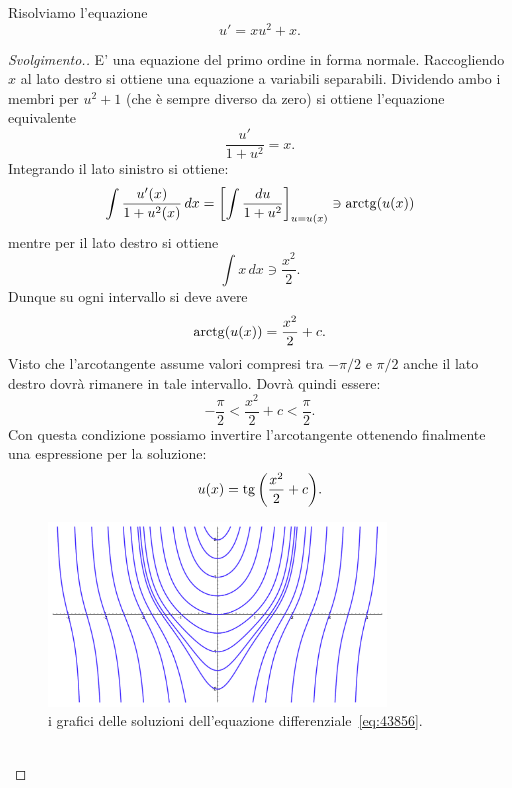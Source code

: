 \begin{example}
Risolviamo l'equazione
\begin{equation}\label{eq:43856}
  u' = x u^2 + x.
\end{equation}
\end{example}
%
\begin{proof}[Svolgimento.]
E' una equazione del primo ordine in forma normale.
Raccogliendo $x$ al lato destro si ottiene una equazione a variabili separabili.
Dividendo ambo i membri per $u^2+1$ (che è sempre diverso da zero) si ottiene l'equazione equivalente
\[
\frac{u'}{1+u^2} = x.
\]
Integrando il lato sinistro si ottiene:
\[
  \int \frac{u'(x)}{1+u^2(x)}\, dx
  = {\left[ \int \frac{du}{1+u^2} \right]}_{u=u(x)}
  \ni \operatorname{arctg}(u(x))
\]
mentre per il lato destro si ottiene
\[
  \int x\, dx \ni \frac{x^2}{2}.
\]
Dunque su ogni intervallo si deve avere
\[
  \operatorname{arctg}(u(x)) = \frac{x^2}{2} + c.
\]
Visto che l'arcotangente assume valori compresi tra $-\pi/2$ e $\pi/2$ anche il lato destro dovrà rimanere in tale intervallo. Dovrà quindi essere:
\begin{equation}\label{eq:4856}
  -\frac \pi 2 < \frac {x^2} 2 + c < \frac \pi 2 .
\end{equation}
Con questa condizione possiamo invertire l'arcotangente ottenendo finalmente una espressione per la soluzione:
\begin{equation}\label{eq:45876314}
  u(x) = \operatorname{tg}{\left( \frac{x^2}{2} + c \right)}.
\end{equation}

\newsavebox{\qrquattrotre}
\begin{figure}
\centering
\includegraphics[width=0.8\textwidth]{fig_43856.pdf}
\caption{i grafici delle soluzioni dell'equazione differenziale~\eqref{eq:43856}.
\ifwidemargin\\\\\fi%
\usebox{\qrquattrotre}}
\label{fig:43856}
\end{figure}


\end{proof}
